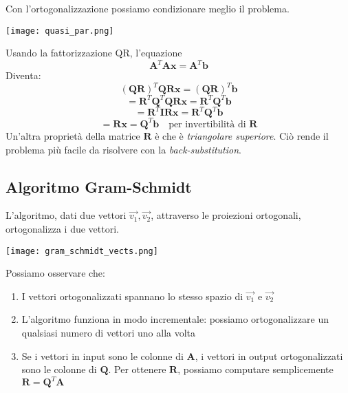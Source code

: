 \documentclass{article}
\begin{document}
            Con l'ortogonalizzazione possiamo condizionare meglio il problema.
            \begin{center}\texttt{[image: quasi\_par.png]}\end{center}
            Usando la fattorizzazione QR, l'equazione
            \[\mathbf{A}^T\mathbf{Ax} = \mathbf{A}^T\mathbf{b}\]
            Diventa:
            \[ ( \mathbf{QR} )^T \mathbf{QRx} = (\mathbf{QR})^T \mathbf{b} \]
            \[ = \mathbf{R}^T \mathbf{Q}^T \mathbf{QRx} = \mathbf{R}^T \mathbf{Q}^T \mathbf{b} \]
            \[ = \mathbf{R}^T \mathbf{IRx} = \mathbf{R}^T \mathbf{Q}^T \mathbf{b}\]
            \[ = \mathbf{Rx} = \mathbf{Q}^T\mathbf{b} \quad \text{per invertibilità di $\mathbf{R}$}\] 
            Un'altra proprietà della matrice $\mathbf{R}$ è che è \emph{triangolare superiore}. Ciò rende il problema più 
            facile da risolvere con la \emph{back-substitution}.

        \subsection{Algoritmo Gram-Schmidt}
            L'algoritmo, dati due vettori $\vec{v_1}, \vec{v_2}$, attraverso le proiezioni ortogonali, ortogonalizza i due vettori.
            \begin{center}\texttt{[image: gram\_schmidt\_vects.png]}\end{center}
            Possiamo osservare che:
            \begin{enumerate}
                \item I vettori ortogonalizzati spannano lo stesso spazio di $\vec{v_1}$ e $\vec{v_2}$
                \item L'algoritmo funziona in modo incrementale: possiamo ortogonalizzare un qualsiasi numero di vettori uno alla volta
                \item Se i vettori in input sono le colonne di $\mathbf{A}$, i vettori in output ortogonalizzati sono le colonne di $\mathbf{Q}$. Per ottenere $\mathbf{R}$,
                 possiamo computare semplicemente $\mathbf{R} = \mathbf{Q}^T\mathbf{A}$
            \end{enumerate}
\end{document}

